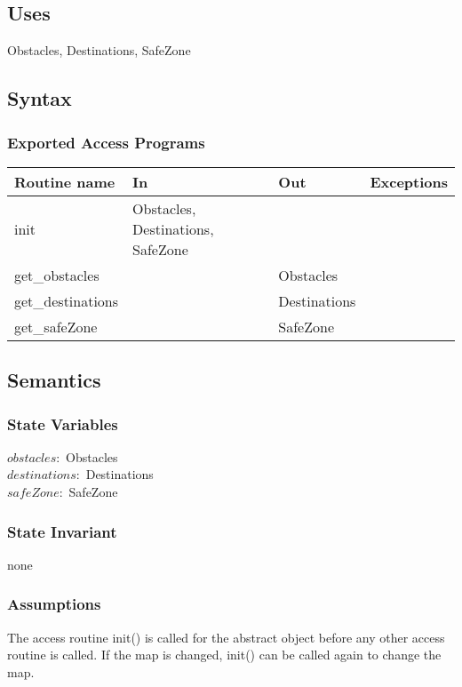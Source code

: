 \documentclass[12pt]{article}
\begin{document}
\subsection* {Uses}
Obstacles, Destinations, SafeZone
\subsection* {Syntax}
\subsubsection* {Exported Access Programs}
\begin{tabular}{| l | l | l | l |}
\hline
\textbf{Routine name} & \textbf{In} & \textbf{Out} & \textbf{Exceptions}\\
\hline
init & Obstacles, Destinations, SafeZone & ~ & ~\\
\hline
get\_obstacles & ~ & Obstacles & ~\\
\hline
get\_destinations & ~ & Destinations & ~\\
\hline
get\_safeZone & ~ & SafeZone & ~\\
\hline
\end{tabular}
\subsection* {Semantics}
\subsubsection*{State Variables}
$\mathit{obstacles}:$ Obstacles\\
$\mathit{destinations}:$ Destinations\\
$\mathit{safeZone}:$ SafeZone
\subsubsection* {State Invariant}
none
\subsubsection* {Assumptions}
The access routine init() is called for the abstract object before any other access routine is called.  If the map is
changed, init() can be called again to change the map.
\end{document}
